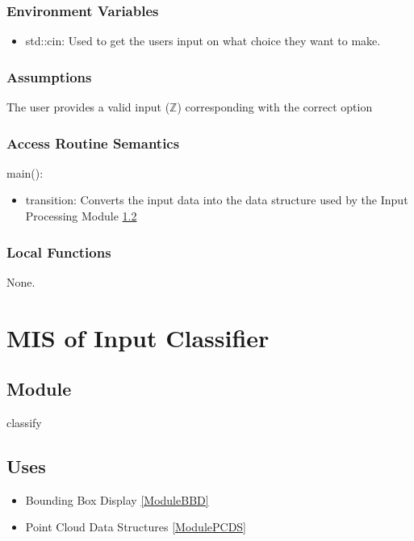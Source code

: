 \documentclass[12pt, titlepage]{article}
\begin{document}
\subsubsection{Environment Variables}

\begin{itemize}
  \item std::cin: Used to get the users input on what choice they want to make.
\end{itemize}

\subsubsection{Assumptions}

The user provides a valid input ($\mathbb{Z}$) corresponding with the correct option

\subsubsection{Access Routine Semantics}

\noindent main():
\begin{itemize}
  \item transition: Converts the input data into the data structure used by the Input Processing Module \ref{}
\end{itemize}

\subsubsection{Local Functions}

None.

\newpage

\section{MIS of Input Classifier} \label{ModuleIC} 

\subsection{Module}

classify

\subsection{Uses}


\begin{itemize}
  \item Bounding Box Display \ref{ModuleBBD}
  \item Point Cloud Data Structures \ref{ModulePCDS}
\end{itemize}
\end{document}
